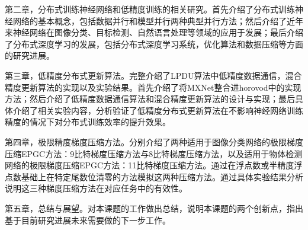 第二章，分布式训练神经网络和低精度训练的相关研究。首先介绍了分布式训练神经网络的基本概念，包括数据并行和模型并行两种典型并行方法；然后介绍了近年来神经网络在图像分类、目标检测、自然语言处理等领域的应用于发展；最后介绍了分布式深度学习的发展，包括分布式深度学习系统，优化算法和数据压缩等方面的研究进展。

第三章，低精度分布式更新算法。完整介绍了LPDU算法中低精度数据通信，混合精度更新算法的实现以及实验结果。首先介绍了将MXNet整合进horovod中的实现方法；然后介绍了低精度数据通信算法和混合精度更新算法的设计与实现；最后具体介绍了相关实验内容，分析验证了低精度分布式更新算法在不影响神经网络训练精度的情况下对分布式训练效率的提升效果。

第四章，极限精度梯度压缩方法。分别介绍了两种适用于图像分类网络的极限梯度压缩EPGC方法：9比特梯度压缩方法与8比特梯度压缩方法，以及适用于物体检测网络的极限梯度压缩EPGC方法：11比特梯度压缩方法。通过在浮点数或半精度浮点数基础上在特定尾数位清零的方法模拟这两种压缩方法。通过具体实验结果分析说明这三种梯度压缩方法在对应任务中的有效性。

第五章，总结与展望。对本课题的工作做出总结，说明本课题的两个创新点，指出基于目前研究进展未来需要做的下一步工作。
